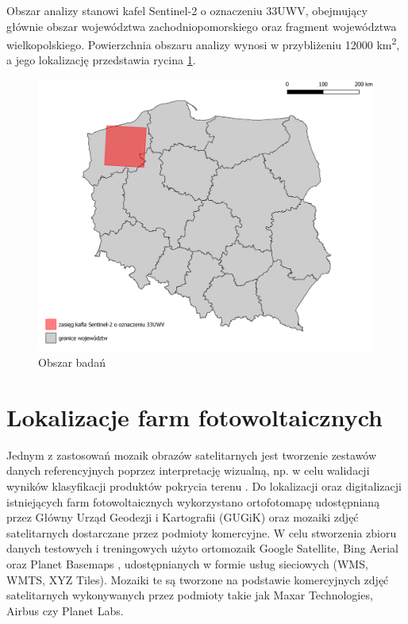 \documentclass{amuthesis}
\begin{document}
Obszar analizy stanowi kafel Sentinel-2 o oznaczeniu 33UWV, obejmujący
głównie obszar województwa zachodniopomorskiego oraz fragment
województwa wielkopolskiego. Powierzchnia obszaru analizy wynosi w
przybliżeniu 12000 km\textsuperscript{2}, a jego lokalizację przedstawia
rycina \ref{fig-rycina-area}.

\begin{figure}[t]

{\centering \includegraphics[width=1\textwidth,height=\textheight]{figures/sen2_extent.png}

}

\caption{\label{fig-rycina-area}Obszar badań}

\end{figure}

\hypertarget{sec-pv}{%
\section{Lokalizacje farm fotowoltaicznych}\label{sec-pv}}

Jednym z zastosowań mozaik obrazów satelitarnych jest tworzenie zestawów
danych referencyjnych poprzez interpretację wizualną, np. w celu
walidacji wyników klasyfikacji produktów pokrycia terenu
\autocite{lesiv_2018_sat_imagery_mosaics}. Do lokalizacji oraz
digitalizacji istniejących farm fotowoltaicznych wykorzystano
ortofotomapę udostępnianą przez Główny Urząd Geodezji i Kartografii
(GUGiK) oraz mozaiki zdjęć satelitarnych dostarczane przez podmioty
komercyjne. W celu stworzenia zbioru danych testowych i treningowych
użyto ortomozaik Google Satellite, Bing Aerial oraz Planet Basemaps
\autocite{planet}, udostępnianych w formie usług sieciowych (WMS, WMTS,
XYZ Tiles). Mozaiki te są tworzone na podstawie komercyjnych zdjęć
satelitarnych wykonywanych przez podmioty takie jak Maxar Technologies,
Airbus czy Planet Labs.
\end{document}
